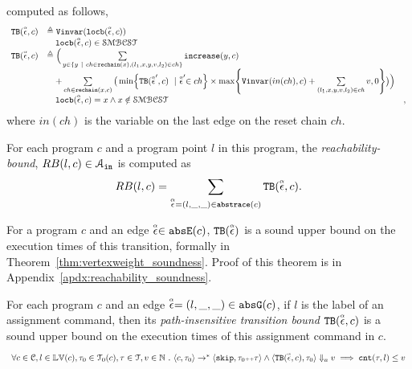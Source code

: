 \begin{enumerate}
\begin{defn}
computed as follows,
\[ 
\begin{array}{lll}
  \absclr(\absevent, c) 
  & \triangleq \varinvar(\locbound(\absevent, c))  & \\
  & \quad \locbound(\absevent, c) \in \constdom & \\
  \absclr(\absevent, c) 
  & \triangleq \Big(
    \sum\limits_{y \in \{ y ~|~ 
    ch \in \resetchain(x), (l_1, x, y, v, l_2) \in ch \} } \incrs(y, c) & \\
    & \quad + 
  \sum\limits_{ch \in \resetchain(x, c)}
  \big( \min\left\{\absclr(\absevent', c) ~\mid~ \absevent' \in ch\right\} \times 
  \max\left\{\varinvar(in(ch), c) + \sum\limits_{(l_1, x, y, v, l_2) \in ch } v, 0 \right\}\big) \Big)  & \\
  &  \quad \locbound(\absevent, c) = x \land x \notin \constdom & ,
\end{array}
  \]
 where $in(ch)$ is the variable on the last edge on the reset chain $ch$.
\end{defn}
\begin{defn}
  \label{def:rb}
  For each program ${c}$ and a program point $l$ in this program,
   the \emph{reachability-bound},
  $RB(l, c) \in \mathcal{A}_{\mathtt{in}}$ is computed as
\[ 
  RB(l, c) = \sum\limits_{\stackrel{\scriptscriptstyle{\alpha}}{\mathtt{\epsilon}{}} = (l, \_, \_) \in \mathtt{abs}{\mathtt{trace}}(c)} {\mathtt{TB}}(\stackrel{\scriptscriptstyle{\alpha}}{\mathtt{\epsilon}{}}, c).
  \]
\end{defn}

For a program $c$ and an edge $\stackrel{\scriptscriptstyle{\alpha}}{\mathtt{\epsilon}{}} \in \mathtt{abs}{\mathtt{E}}(c)$,
${\mathtt{TB}}(\stackrel{\scriptscriptstyle{\alpha}}{\mathtt{\epsilon}{}})$ is a sound upper bound
on the execution times of this transition,
formally in Theorem~\ref{thm:vertexweight_soundness}. 
Proof of this theorem is in Appendix~\ref{apdx:reachability_soundness}.
%
\begin{lem}
  \label{lem:edge_bound_soundness}
For each program ${c}$ and an edge $\stackrel{\scriptscriptstyle{\alpha}}{\mathtt{\epsilon}{}} = (l, \_, \_) \in \mathtt{abs}{\mathtt{G}}(c)$, if $l$ is the label of an assignment command,
then its \emph{path-insensitive transition bound} ${\mathtt{TB}}(\stackrel{\scriptscriptstyle{\alpha}}{\mathtt{\epsilon}{}}, c)$ 
 is a sound upper bound on 
the execution times of this assignment command in $c$.
  \[
    \begin{array}{l}
      \forall c \in \mathcal{C}, l \in \mathbb{LV}(c),\mathtt{\tau}_0 \in \mathcal{T}_0(c), 
      \mathtt{\tau} \in \mathcal{T}, v \in \mathbb{N}
       ~.~ 
       \langle {c}, \mathtt{\tau}_0 \rangle \to^{*} \langle \mathtt{skip}, \mathtt{\tau}_0{\scriptscriptstyle ++}\mathtt{\tau} \rangle 
       \land \langle {\ensuremath{\mathtt{TB}}}(\stackrel{\scriptscriptstyle{\alpha}}{\mathtt{\epsilon}{}}, c), \mathtt{\tau}_0 \rangle \Downarrow_a v
      \implies
      \mathtt{cnt}(\mathtt{\tau}, l) \leq v
    \end{array}
    \]
\end{lem}
%

\end{enumerate}

